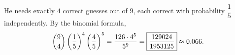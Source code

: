 He needs exactly $4$ correct guesses out of $9$, each correct with probability $\dfrac{1}{5}$ independently. By the binomial formula,
\[
\dbinom94\left(\dfrac{1}{5}\right)^4\left(\dfrac{4}{5}\right)^5=\dfrac{126\cdot4^5}{5^9}=\boxed{\dfrac{129024}{1953125}}\approx0.066 .
\]
